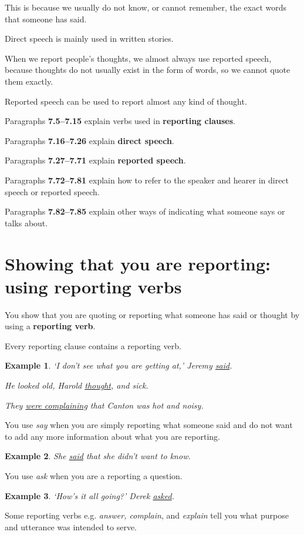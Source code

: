 \documentclass[oneside]{book}
\numberwithin{equation}{section}
\newtheorem{example}{Example}[section]
\begin{document}
This is because we usually do not know, or cannot remember, the exact words that someone has said.

Direct speech is mainly used in written stories.

%
When we report people's thoughts, we almost always use reported speech, because thoughts do not usually exist in the form of words, so we cannot quote them exactly.

Reported speech can be used to report almost any kind of thought.

%
\noindent{} Paragraphs \textbf{7.5--7.15} explain verbs used in \textbf{reporting clauses}.

Paragraphs \textbf{7.16--7.26} explain \textbf{direct speech}.

Paragraphs \textbf{7.27--7.71} explain \textbf{reported speech}.

Paragraphs \textbf{7.72--7.81} explain how to refer to the speaker and hearer in direct speech or reported speech.

Paragraphs \textbf{7.82--7.85} explain other ways of indicating what someone says or talks about.

\section{Showing that you are reporting: using reporting verbs}
\noindent{} You show that you are quoting or reporting what someone has said or thought by using a \textbf{reporting verb}.

Every reporting clause contains a reporting verb.
\begin{example}
    `I don't see what you are getting at,' Jeremy \underline{said}.
    
    He looked old, Harold \underline{thought}, and sick.
    
    They \underline{were complaining} that Canton was hot and noisy.
\end{example}
%
\noindent{} You use \textit{say} when you are simply reporting what someone said and do not want to add any more information about what you are reporting.
\begin{example}
    She \underline{said} that she didn't want to know.
\end{example}
You use \textit{ask} when you are a reporting a question.
\begin{example}
    `How's it all going?' Derek \underline{asked}.
\end{example}
%
\noindent{} Some reporting verbs e.g. \textit{answer, complain}, and \textit{explain} tell you what purpose and utterance was intended to serve.
\end{document}
